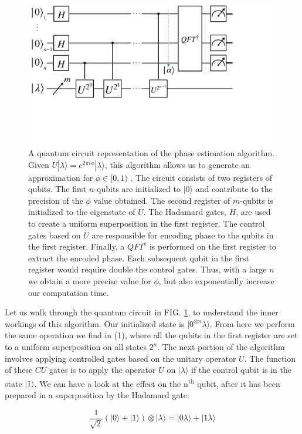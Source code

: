 \documentclass[msc,oneside]{ubcthesis}
\begin{document}
	
	\begin{figure}[!h]
		\centering
		\includegraphics[trim={1cm 12cm 11cm 0},clip, width=0.8 \linewidth]{"graphics/phase_circ"}
		\caption{A quantum circuit representation of the phase estimation algorithm. Given $ U |\lambda \rangle = e^{2\pi i \phi} |\lambda \rangle $, this algorithm allows us to generate an  approximation for $\phi \in [0,1)$ . The circuit consists of two registers of qubits. The first $n$-qubits are initialized to $|0\rangle$ and contribute to the precision of the $\phi$ value obtained. The second register of $m$-qubits is initialized to the eigenstate of $U$.  The Hadamard gates, $H$, are used to create a uniform superposition in the first register. The control gates based on $U$ are responsible for encoding phase to the qubits in the first register. Finally, a $QFT^\dagger$ is performed on the first register to extract the encoded phase. Each subsequent qubit in the first register would require double the control gates. Thus, with a large $n$ we obtain a more precise value for $\phi$, but also exponentially increase our computation time.}
		\label{fig:phasrcircuit}
	\end{figure}
	
	
	Let us walk through the quantum circuit in FIG. \ref{fig:phasrcircuit}, to understand the inner workings of this algorithm.	 Our initialized state is $|0^{\otimes n} \lambda\rangle$. From here we perform the same operation we find in (1), where all the qubits in the first register are set to a uniform superposition on all states $2^n$. The next portion of the algorithm involves applying controlled gates based on the unitary operator $U$. The function of these $CU$ gates is to apply the operator $U$ on $|\lambda\rangle$ if the control qubit is in the state $|1\rangle$. We can have a look at the effect on the n\textsuperscript{th} qubit, after it has been prepared in a superposition by the Hadamard gate:
	
	$$ \frac{1}{\sqrt{2}}(|0\rangle + |1\rangle) \otimes |\lambda\rangle = |0 \lambda \rangle + |1 \lambda\rangle$$
	
\end{document}
